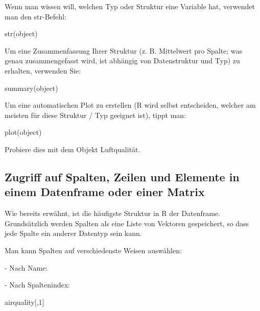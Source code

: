 \documentclass[a4paper,twoside]{tufte-book}\usepackage[]{graphicx}\usepackage[]{color}
\begin{document}
\begin{Anhang}
Wenn man wissen will, welchen Typ oder Struktur eine Variable hat, verwendet man den str-Befehl:

\begin{Schunk}
\begin{Sinput}
str(object)
\end{Sinput}
\end{Schunk}

Um eine Zusammenfassung Ihrer Struktur (z. B. Mittelwert pro Spalte; was genau zusammengefasst wird, ist abhängig von Datenstruktur und Typ) zu erhalten, verwenden Sie:

\begin{Schunk}
\begin{Sinput}
summary(object)
\end{Sinput}
\end{Schunk}

Um eine automatischen Plot zu erstellen (R wird selbst entscheiden, welcher am meisten für diese Struktur / Typ geeignet ist), tippt man:

\begin{Schunk}
\begin{Sinput}
plot(object)
\end{Sinput}
\end{Schunk}

Probiere dies mit dem Objekt Luftqualität.

\subsection{Zugriff auf Spalten, Zeilen und Elemente in einem Datenframe oder einer Matrix}

Wie bereits erwähnt, ist die häufigste Struktur in R der Datenframe. Grundsätzlich werden Spalten als eine Liste von Vektoren gespeichert, so dass jede Spalte ein anderer Datentyp sein kann.

Man kann Spalten auf verschiedenste Weisen auswählen:

- Nach Name:
\begin{Schunk}
\end{Schunk}

- Nach Spaltenindex: 

\begin{Schunk}
\begin{Sinput}
airquality[,1]
\end{Sinput}
\end{Schunk}


\end{Anhang}
\end{document}
